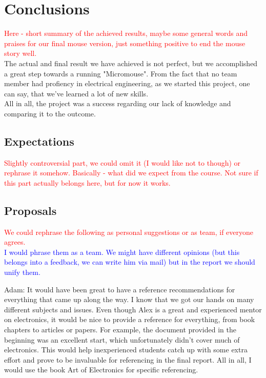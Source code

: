 \section{Conclusions}
\textcolor{red}{
Here - short summary of the achieved results, maybe some general words and praises for our final mouse version, just something positive to end the mouse story well.
}\\

\noindent
The actual and final result we have achieved is not perfect, but we accomplished a great step towards a running "Micromouse". From the fact that no team member had profiency in electrical engineering, as we started this project, one can say, that we've learned a lot of new skills. \\
All in all, the project was a success regarding our lack of knowledge and comparing it to the outcome. 

\subsection{Expectations}
\textcolor{red}{
Slightly controversial part, we could omit it (I would like not to though) or rephrase it somehow. Basically - what did we expect from the course. Not sure if this part actually belongs here, but for now it works.
}
\subsection{Proposals}

\textcolor{red}{We could rephrase the following as personal suggestions or as team, if everyone agrees.}\\
\textcolor{blue}{I would phrase them as a team. We might have different opinions (but this belongs into a feedback, we can write him via mail) but in the report we should unify them.}

Adam: It would have been great to have a reference recommendations for everything that came up along the way. I know that we got our hands on many different subjects and issues. Even though Alex is a great and experienced mentor on electronics, it would be nice to provide a reference for everything, from book chapters to articles or papers. For example, the document provided in the beginning was an excellent start, which unfortunately didn't cover much of electronics. This would help inexperienced students catch up with some extra effort and prove to be invaluable for referencing in the final report. All in all, I would use the book Art of Electronics for specific referencing.

